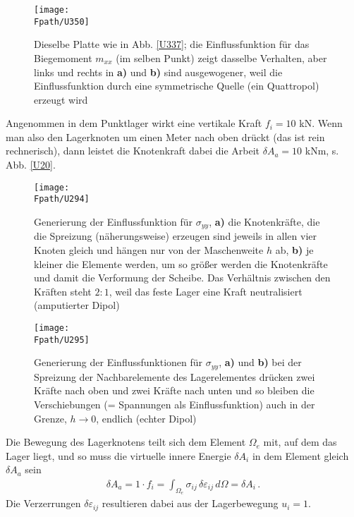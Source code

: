 {{{{{{%
\begin{figure}
\centering
\if {} \sidecaption[t] \fi
{\texttt{[image: \\Fpath/U350]}}
\caption{Dieselbe Platte wie in Abb. \ref{U337}; die Einflussfunktion f\"{u}r das Biegemoment $m_{xx}$ (im selben Punkt) zeigt dasselbe Verhalten, aber links und rechts in \textbf{ a)} und \textbf{ b)} sind ausgewogener, weil die Einflussfunktion durch eine symmetrische Quelle (ein Quattropol) erzeugt wird}
\label{U350}%
\end{figure}%

Angenommen in dem Punktlager wirkt eine vertikale Kraft $f_i = 10 $ kN. Wenn man also den Lagerknoten um einen Meter nach oben dr\"{u}ckt (das ist rein rechnerisch), dann leistet die Knotenkraft dabei die Arbeit $\delta A_a =10$ kNm, s. Abb. \ref{U20}.
\begin{figure}
\centering
\if {} \sidecaption[t] \fi
{\texttt{[image: \\Fpath/U294]}}
\caption{Generierung der Einflussfunktion f\"{u}r $\sigma_{yy}$, \textbf{ a)} die Knotenkr\"{a}fte, die die Spreizung (n\"{a}herungsweise) erzeugen sind jeweils in allen vier Knoten gleich und h\"{a}ngen nur von der Maschenweite $h$ ab, \textbf{ b)} je kleiner die Elemente werden, um so gr\"{o}{\ss}er werden die Knotenkr\"{a}fte und damit die Verformung der Scheibe. Das Verh\"{a}ltnis zwischen den Kr\"{a}ften steht $2:1$, weil das feste Lager eine Kraft neutralisiert (\glq amputierter Dipol\grq{})}
\label{U294}%
\end{figure}%

\begin{figure}
\centering
{\texttt{[image: \\Fpath/U295]}}
\caption{Generierung der Einflussfunktionen f\"{u}r $\sigma_{yy}$, \textbf{ a)} und \textbf{ b)} bei der Spreizung der Nachbarelemente des Lagerelementes dr\"{u}cken zwei Kr\"{a}fte nach oben und zwei Kr\"{a}fte nach unten und so bleiben die  Verschiebungen (= Spannungen als Einflussfunktion) auch in der Grenze, $h \to 0$, endlich (\glq echter Dipol\grq{})}
\label{U295}%
\end{figure}%
Die Bewegung des Lagerknotens teilt sich dem Element $\Omega_e$ mit, auf dem das Lager liegt, und so muss die virtuelle innere Energie $\delta A_i$ in dem Element gleich $\delta A_a$ sein
\begin{align}
\delta A_a = 1\cdot f_i = \int_{\Omega_e} \sigma_{ij}\,\delta \varepsilon_{ij}\,d\Omega = \delta A_i\,.
\end{align}
Die Verzerrungen $\delta \varepsilon_{ij}$ resultieren dabei aus der Lagerbewegung $u_i = 1$.

}}}}}}
